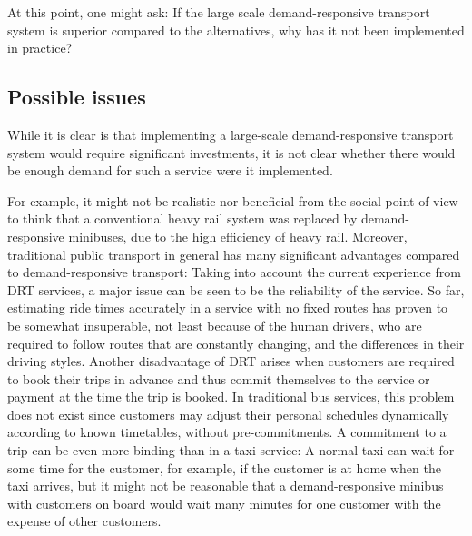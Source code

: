 \documentclass[dissertation,draft*]{aaltoseries}
\begin{document}
At this point, one might ask: If the large scale demand-responsive transport system is superior 
compared to the alternatives, why has it not been implemented in practice? 

\subsection{Possible issues} %
While it is clear is that implementing a large-scale demand-responsive transport system 
would require significant investments, it is not clear 
whether there would be enough demand for such a service were it implemented. 

For example, it might not be realistic nor beneficial from the social point of view 
to think that a conventional heavy rail system was replaced by demand-responsive minibuses, 
due to the high efficiency of heavy rail.
Moreover, traditional public transport in general has many significant advantages compared to
demand-responsive transport: Taking into account the current experience from DRT services,
a major issue can be seen to be the reliability of the service. So far, estimating ride times accurately
in a service with no fixed routes has proven to be somewhat insuperable, not least because
of the human drivers, who are required to follow routes that are constantly changing, and the
differences in their driving styles. Another disadvantage of DRT arises when customers are 
required to book their trips in advance and thus commit themselves to the service or payment
at the time the trip is booked. In traditional bus services, this problem does not
exist since customers may adjust their personal schedules dynamically according to known timetables,
without pre-commitments. A commitment to a trip can be even more binding than in a taxi service:
A normal taxi can wait for some time for the customer, for example, if the customer is at home 
when the taxi arrives, but it might not be reasonable that a demand-responsive minibus with 
customers on board would wait many minutes for one customer with the expense of other customers.
\end{document}
